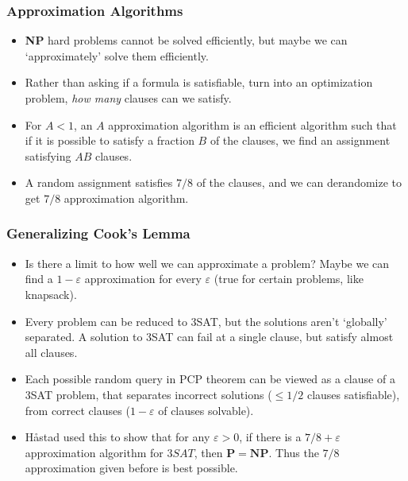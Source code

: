 \documentclass{beamer}
\begin{document}
\begin{frame}
    \frametitle{Approximation Algorithms}

    \begin{itemize}
        \item<1-> {\bf NP} hard problems cannot be solved efficiently, but maybe we can `approximately' solve them efficiently.

        \item<2-> Rather than asking if a formula is satisfiable, turn into an optimization problem, {\it how many} clauses can we satisfy.

        \item<3-> For $A < 1$, an $A$ approximation algorithm is an efficient algorithm such that if it is possible to satisfy a fraction $B$ of the clauses, we find an assignment satisfying $AB$ clauses.

        \item<4-> A random assignment satisfies $7/8$ of the clauses, and we can derandomize to get $7/8$ approximation algorithm.
    \end{itemize}
\end{frame}

\begin{frame}
    \frametitle{Generalizing Cook's Lemma}

    \begin{itemize}
        \item<1-> Is there a limit to how well we can approximate a problem? Maybe we can find a $1 - \varepsilon$ approximation for every $\varepsilon$ (true for certain problems, like knapsack).

        \item<2-> Every problem can be reduced to 3SAT, but the solutions aren't `globally' separated. A solution to 3SAT can fail at a single clause, but satisfy almost all clauses.

        \item<3-> Each possible random query in PCP theorem can be viewed as a clause of a 3SAT problem, that separates incorrect solutions ($\leq 1/2$ clauses satisfiable), from correct clauses ($1 - \varepsilon$ of clauses solvable).

        \item<4-> H\r{a}stad used this to show that for any $\varepsilon > 0$, if there is a $7/8 + \varepsilon$ approximation algorithm for $3SAT$, then $\mathbf{P} = \mathbf{NP}$. Thus the $7/8$ approximation given before is best possible.
    \end{itemize}
\end{frame}
\end{document}
